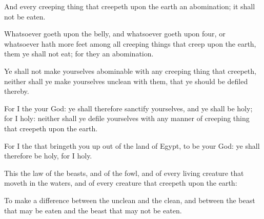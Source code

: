 {And every creeping
thing that
creepeth upon the
earth
{} an
abomination; it shall not be
eaten.

Whatsoever
goeth upon the
belly, and whatsoever
goeth upon
{}
four, or whatsoever hath
more
feet among all creeping
things that
creep upon the
earth, them ye shall not
eat; for they
{} an
abomination.


\par }{\PP {}Ye shall not
make
yourselves
abominable with any creeping
thing that
creepeth, neither shall ye make yourselves
unclean with them, that ye should be
defiled thereby.

For I
{} the
{} your
God: ye shall therefore sanctify
yourselves, and ye shall be
holy; for I
{}
holy: neither shall ye
defile
yourselves with any manner of creeping
thing that
creepeth upon the
earth.

For I
{} the
{} that
bringeth you up out of the
land of
Egypt, to be your
God: ye shall therefore be
holy, for I
{}
holy.

This
{} the
law of the
beasts, and of the
fowl, and of every
living
creature that
moveth in the
waters, and of every
creature that
creepeth upon the
earth:

To make a
difference between the
unclean and the
clean, and between the
beast that may be
eaten and the
beast that may not be
eaten.




\par }
